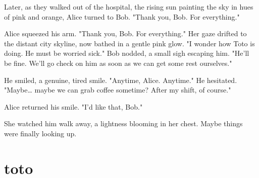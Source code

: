 \documentclass{article}
\begin{document}
Later, as they walked out of the hospital, the rising sun painting the sky in hues of pink and orange, Alice turned to Bob. "Thank you, Bob. For everything."

Alice squeezed his arm. "Thank you, Bob. For everything." Her gaze drifted to the distant city skyline, now bathed in a gentle pink glow. "I wonder how Toto is doing. He must be worried sick." Bob nodded, a small sigh escaping him. "He'll be fine. We'll go check on him as soon as we can get some rest ourselves."

He smiled, a genuine, tired smile. "Anytime, Alice. Anytime." He hesitated. "Maybe… maybe we can grab coffee sometime? After my shift, of course."

Alice returned his smile. "I'd like that, Bob."

She watched him walk away, a lightness blooming in her chest. Maybe things were finally looking up.

\section{toto}
\end{document}
